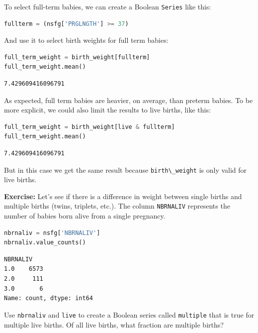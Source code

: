 To select full-term babies, we can create a Boolean
\passthrough{\lstinline!Series!} like this:

\begin{lstlisting}[language=Python,style=source]
fullterm = (nsfg['PRGLNGTH'] >= 37)
\end{lstlisting}

And use it to select birth weights for full term babies:

\begin{lstlisting}[language=Python,style=source]
full_term_weight = birth_weight[fullterm]
full_term_weight.mean()
\end{lstlisting}

\begin{lstlisting}[style=output]
7.429609416096791
\end{lstlisting}

As expected, full term babies are heavier, on average, than preterm
babies. To be more explicit, we could also limit the results to live
births, like this:

\begin{lstlisting}[language=Python,style=source]
full_term_weight = birth_weight[live & fullterm]
full_term_weight.mean()
\end{lstlisting}

\begin{lstlisting}[style=output]
7.429609416096791
\end{lstlisting}

But in this case we get the same result because
\passthrough{\lstinline!birth\_weight!} is only valid for live births.

\textbf{Exercise:} Let's see if there is a difference in weight between
single births and multiple births (twins, triplets, etc.). The column
\passthrough{\lstinline!NBRNALIV!} represents the number of babies born
alive from a single pregnancy.

\begin{lstlisting}[language=Python,style=source]
nbrnaliv = nsfg['NBRNALIV']
nbrnaliv.value_counts()
\end{lstlisting}

\begin{lstlisting}[style=output]
NBRNALIV
1.0    6573
2.0     111
3.0       6
Name: count, dtype: int64
\end{lstlisting}

Use \passthrough{\lstinline!nbrnaliv!} and
\passthrough{\lstinline!live!} to create a Boolean series called
\passthrough{\lstinline!multiple!} that is true for multiple live
births. Of all live births, what fraction are multiple births?

